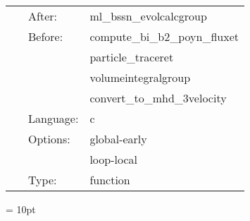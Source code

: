 \documentclass{article}
\begin{document}
\hspace{5mm}{\it convert giraffe-native variables to hydrobase } 


\hspace{5mm}

 \begin{tabular*}{160mm}{cll} 
~ & After:  & ml\_bssn\_evolcalcgroup \\ 
~ & Before:  & compute\_bi\_b2\_poyn\_fluxet \\ 
~& ~ &particle\_traceret\\ 
~& ~ &volumeintegralgroup\\ 
~& ~ &convert\_to\_mhd\_3velocity\\ 
~ & Language:  & c \\ 
~ & Options:  & global-early \\ 
~& ~ &loop-local\\ 
~ & Type:  & function \\ 
\end{tabular*} 



\vspace{5mm}\parskip = 10pt 
\end{document}
